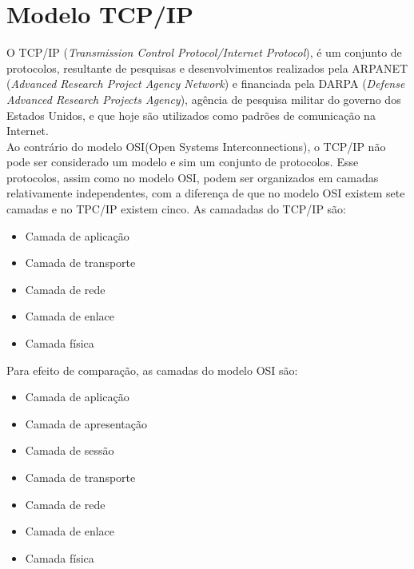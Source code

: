 \section{Modelo TCP/IP}
O TCP/IP (\textit{Transmission Control Protocol/Internet Protocol}), é um conjunto de protocolos, resultante de pesquisas e desenvolvimentos realizados pela ARPANET (\textit{Advanced Research Project Agency Network}) e financiada pela DARPA (\textit{Defense Advanced Research Projects Agency}), agência de pesquisa militar do governo dos Estados Unidos, e que hoje são utilizados como padrões de comunicação na Internet.\\
Ao contrário do modelo OSI(Open Systems Interconnections), o TCP/IP não pode 
ser considerado um modelo e sim um conjunto de protocolos. Esse protocolos, 
assim como no modelo OSI, podem ser organizados em camadas relativamente 
independentes, com a diferença de que no modelo OSI existem sete camadas e no 
TPC/IP existem cinco. As camadadas do TCP/IP são:
\begin{itemize}
	\item Camada de aplicação
	\item Camada de transporte
	\item Camada de rede
	\item Camada de enlace
	\item Camada física
\end{itemize}
Para efeito de comparação, as camadas do modelo OSI são:
\begin{itemize}
	\item Camada de aplicação
	\item Camada de apresentação
	\item Camada de sessão
	\item Camada de transporte
	\item Camada de rede
	\item Camada de enlace
	\item Camada física
\end{itemize}
